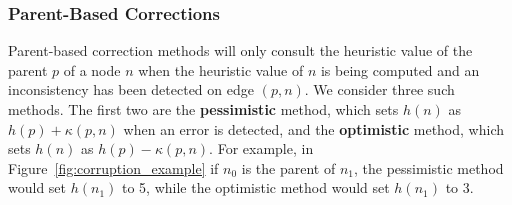 \documentclass[letterpaper]{article}
\begin{document}
\subsubsection{Parent-Based Corrections}
Parent-based correction methods will only consult the heuristic value of the parent $p$ of a node $n$ when the heuristic value of $n$ is being computed and an inconsistency has been detected on edge $(p,n)$. We consider three such methods. The first two are the \textbf{pessimistic} method, which sets $h(n)$ as $h(p) + \kappa(p, n)$ when an error is detected, and the \textbf{optimistic} method, which sets $h(n)$ as $h(p) - \kappa(p, n)$. For example, in Figure~\ref{fig:corruption_example} if $n_0$ is the parent of $n_1$, the pessimistic method would set $h(n_1)$ to 5, while the optimistic method would set $h(n_1)$ to 3.

%
%



\end{document}

